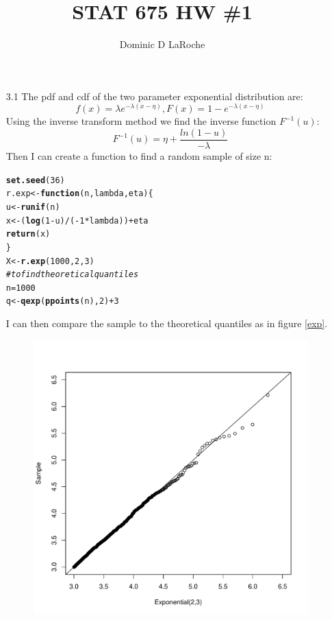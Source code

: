 \documentclass{article}\usepackage[]{graphicx}\usepackage[]{color}
\title{STAT 675 HW \#1}
\author{Dominic D LaRoche}
\makeatletter
\def\maxwidth{ %
  \ifdim\Gin@nat@width>\linewidth
    \linewidth
  \else
    \Gin@nat@width
  \fi
}
\newcommand{\hlcom}[1]{\textcolor[rgb]{0.678,0.584,0.686}{\textit{#1}}}%
\newcommand{\hlkwd}[1]{\textcolor[rgb]{0.737,0.353,0.396}{\textbf{#1}}}%
\newenvironment{kframe}{%
 \def\at@end@of@kframe{}%
 \ifinner\ifhmode%
  \def\at@end@of@kframe{\end{minipage}}%
  \begin{minipage}{\columnwidth}%
 \fi\fi%
 \def\FrameCommand##1{\hskip\@totalleftmargin \hskip-\fboxsep
 \colorbox{shadecolor}{##1}\hskip-\fboxsep
     \hskip-\linewidth \hskip-\@totalleftmargin \hskip\columnwidth}%
 \MakeFramed {\advance\hsize-\width
   \@totalleftmargin\z@ \linewidth\hsize
   \@setminipage}}%
 {\par\unskip\endMakeFramed%
 \at@end@of@kframe}
\newenvironment{knitrout}{}{} %
\makeatother
\begin{document}
\maketitle

\begin{itemize}
\item[3.1] The pdf and cdf of the two parameter exponential distribution are:\\
$$f(x)=\lambda e^{-\lambda(x-\eta)}, F(x)=1-e^{-\lambda(x-\eta)}$$
Using the inverse transform method we find the inverse function $F^{-1}(u)$:
$$F^{-1}(u)=\eta + \frac{ln(1-u)}{-\lambda}$$
Then I can create a function to find a random sample of size n:\\
\begin{knitrout}
\color{fgcolor}\begin{kframe}
\begin{alltt}
\hlkwd{set.seed}(36)
r.exp <- \hlkwd{function}(n, lambda, eta) \{
    u <- \hlkwd{runif}(n)
    x <- (\hlkwd{log}(1 - u)/(-1 * lambda)) + eta
    \hlkwd{return}(x)
\}
X <- \hlkwd{r.exp}(1000, 2, 3)
\hlcom{# to find theoretical quantiles}
n = 1000
q <- \hlkwd{qexp}(\hlkwd{ppoints}(n), 2) + 3
\end{alltt}
\end{kframe}
\end{knitrout}

I can then compare the sample to the theoretical quantiles as in figure \ref{exp}.
\begin{figure}
\begin{knitrout}
\color{fgcolor}
\includegraphics[width=\maxwidth]{figure/qqplot1} 


\end{knitrout}
\end{figure}
\end{itemize}
\end{document}

